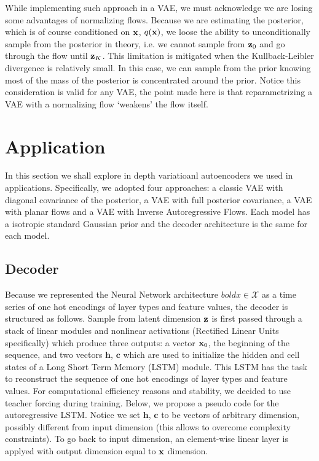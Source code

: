 \documentclass[12pt]{article}
\begin{document}
While implementing such approach in a VAE, we must acknowledge we are losing some advantages of normalizing flows. Because we are estimating the posterior, which is of course conditioned on $\textbf{x}$, $q(\textbf{x})$, we loose the ability to unconditionally sample from the posterior in theory, i.e. we cannot sample from $\textbf{z}_0$ and go through the flow until $\textbf{z}_K$. This limitation is mitigated when the Kullback-Leibler divergence is relatively small. In this case, we can sample from the prior knowing most of the mass of the posterior is concentrated around the prior. Notice this consideration is valid for any VAE, the point made here is that reparametrizing a VAE with a normalizing flow `weakens' the flow itself.  
\section{Application}

In this section we shall explore in depth variatioanl autoencoders we used in applications. Specifically, we adopted four approaches: a classic VAE with diagonal covariance of the posterior, a VAE with full posterior covariance, a VAE with planar flows and a VAE with Inverse Autoregressive Flows. Each model has a isotropic standard Gaussian prior and the decoder architecture is the same for each model.

\subsection{Decoder}

Because we represented the Neural Network architecture \(boldx \in \mathcal{X}\) as a time series of one hot encodings of layer types and feature values, the decoder is structured as follows. Sample from latent dimension \(\textbf{z}\) is first passed through a stack of linear modules and nonlinear activations (Rectified Linear Units specifically) which produce three outputs: a vector \(\textbf{x}_0\), the beginning of the sequence, and two vectors \(\mathbf{h}\), \(\mathbf{c}\) which are used to initialize the hidden and cell states of a Long Short Term Memory (LSTM) module. This LSTM has the task to reconstruct the sequence of one hot encodings of layer types and feature values. For computational efficiency reasons and stability, we decided to use teacher forcing during training. Below, we propose a pseudo code for the autoregressive LSTM. Notice we set \(\mathbf{h}\), \(\mathbf{c}\) to be vectors of arbitrary dimension, possibly different from input dimension (this allows to overcome complexity constraints). To go back to input dimension, an element-wise linear layer is applyed with output dimension equal to \(\textbf{x}\) dimension.
\end{document}
